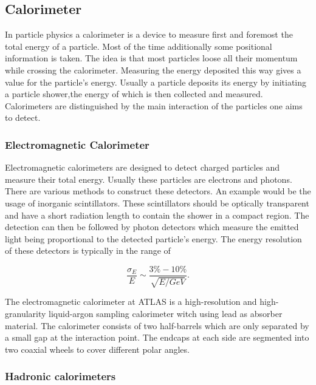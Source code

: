 

\subsection{Calorimeter}

In particle physics a calorimeter is a device to measure first and foremost the total energy of a particle. Most of the time additionally some positional information is taken.
The idea is that most particles loose all their momentum while crossing the calorimeter. Measuring the energy deposited this way gives a value for the particle's energy.
Usually a particle deposits its energy by initiating a particle shower,the energy of which is then collected and measured.
Calorimeters are distinguished by the main interaction of the particles one aims to detect. 
\subsubsection{Electromagnetic Calorimeter}

Electromagnetic calorimeters are designed to detect charged particles and measure their total energy. Usually these particles are electrons and photons. There are various methods to construct these detectors. An example would be the usage of inorganic scintillators. These scintillators should be optically transparent and have a short radiation length to contain the shower in a compact region. The detection can then be followed by photon detectors which measure the emitted light being proportional to the detected particle's energy. The energy resolution of these detectors is typically in the range of

\begin{equation}
\frac{\sigma_E}{E} \sim \frac{3 \% - 10 \%}{\sqrt{E/GeV}}.
\end{equation}

The electromagnetic calorimeter at ATLAS is a high-resolution and high-granularity liquid-argon sampling calorimeter witch using lead as absorber material. The calorimeter consists of two half-barrels which are only separated by a small gap at the interaction point. The endcaps at each side are segmented into two coaxial wheels to cover different polar angles.

\subsubsection{Hadronic calorimeters}

